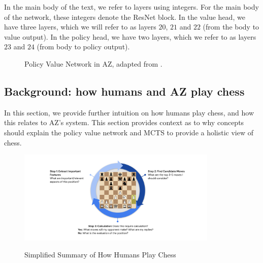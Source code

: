 \documentclass{article}
\begin{document}
In the main body of the text, we refer to layers using integers. For the main body of the network, these integers denote the ResNet block. In the value head, we have three layers, which we will refer to as layers $20$, $21$ and $22$ (from the body to value output). 
In the policy head, we have two layers, which we refer to as layers $23$ and $24$ (from body to policy output).

\begin{figure}[h]
\caption{Policy Value Network in AZ, adapted from \cite{mcgrath2021acquisition}. }
\centering
\vspace{0.2cm}
\scalebox{0.64}{

}
\label{fig:az_network}
\end{figure}
\FloatBarrier

\subsection{Background: how humans and AZ play chess} \label{appendix: how AZ plays chess}
In this section, we provide further intuition on how humans play chess, and how this relates to AZ's system. This section provides context as to why concepts should explain the policy value network and MCTS to provide a holistic view of chess. 

\begin{figure}[ht] 
\centering
\caption{Simplified Summary of How Humans Play Chess}
\includegraphics[width=0.85\textwidth]{human_calc.png}
\label{fig:human_calc}
\end{figure}
\end{document}
